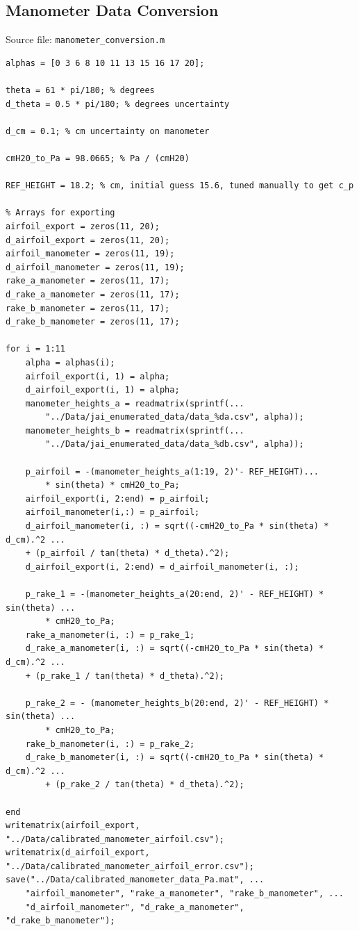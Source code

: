 \documentclass[runningheads]{llncs}
\begin{document}
\subsection{Manometer Data Conversion}

Source file: \verb|manometer_conversion.m|

\begin{verbatim}
alphas = [0 3 6 8 10 11 13 15 16 17 20];

theta = 61 * pi/180; % degrees
d_theta = 0.5 * pi/180; % degrees uncertainty

d_cm = 0.1; % cm uncertainty on manometer

cmH20_to_Pa = 98.0665; % Pa / (cmH20)

REF_HEIGHT = 18.2; % cm, initial guess 15.6, tuned manually to get c_p

% Arrays for exporting
airfoil_export = zeros(11, 20);
d_airfoil_export = zeros(11, 20);
airfoil_manometer = zeros(11, 19);
d_airfoil_manometer = zeros(11, 19);
rake_a_manometer = zeros(11, 17);
d_rake_a_manometer = zeros(11, 17);
rake_b_manometer = zeros(11, 17);
d_rake_b_manometer = zeros(11, 17);

for i = 1:11
    alpha = alphas(i);
    airfoil_export(i, 1) = alpha;
    d_airfoil_export(i, 1) = alpha;
    manometer_heights_a = readmatrix(sprintf(...
        "../Data/jai_enumerated_data/data_%da.csv", alpha));
    manometer_heights_b = readmatrix(sprintf(...
        "../Data/jai_enumerated_data/data_%db.csv", alpha));
    
    p_airfoil = -(manometer_heights_a(1:19, 2)'- REF_HEIGHT)...
        * sin(theta) * cmH20_to_Pa;
    airfoil_export(i, 2:end) = p_airfoil;
    airfoil_manometer(i,:) = p_airfoil;
    d_airfoil_manometer(i, :) = sqrt((-cmH20_to_Pa * sin(theta) * d_cm).^2 ...
    + (p_airfoil / tan(theta) * d_theta).^2);
    d_airfoil_export(i, 2:end) = d_airfoil_manometer(i, :);
    
    p_rake_1 = -(manometer_heights_a(20:end, 2)' - REF_HEIGHT) * sin(theta) ...
        * cmH20_to_Pa;
    rake_a_manometer(i, :) = p_rake_1;
    d_rake_a_manometer(i, :) = sqrt((-cmH20_to_Pa * sin(theta) * d_cm).^2 ...
    + (p_rake_1 / tan(theta) * d_theta).^2);
    
    p_rake_2 = - (manometer_heights_b(20:end, 2)' - REF_HEIGHT) * sin(theta) ...
        * cmH20_to_Pa;
    rake_b_manometer(i, :) = p_rake_2;
    d_rake_b_manometer(i, :) = sqrt((-cmH20_to_Pa * sin(theta) * d_cm).^2 ...
        + (p_rake_2 / tan(theta) * d_theta).^2);
    
end
writematrix(airfoil_export, "../Data/calibrated_manometer_airfoil.csv");
writematrix(d_airfoil_export, "../Data/calibrated_manometer_airfoil_error.csv");
save("../Data/calibrated_manometer_data_Pa.mat", ...
    "airfoil_manometer", "rake_a_manometer", "rake_b_manometer", ...
    "d_airfoil_manometer", "d_rake_a_manometer", "d_rake_b_manometer");
\end{verbatim}
\end{document}
